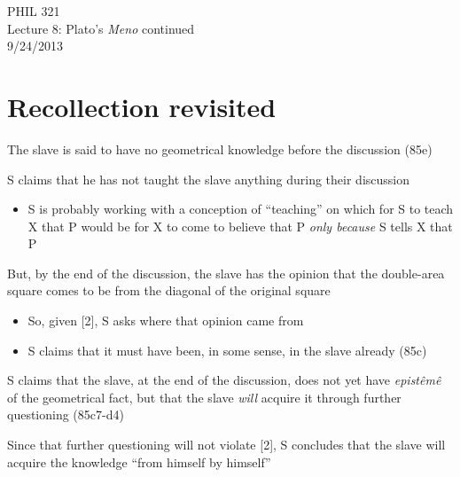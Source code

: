 \documentclass[11pt]{article}
\begin{document}
\thispagestyle{empty}
\begin{center} \LARGE{PHIL 321\\ Lecture 8: Plato's \emph{Meno} continued}\\ \vspace*{2mm}
\large{9/24/2013}\end{center}
\thispagestyle{empty}\vspace*{3mm}
\vspace*{-8mm}

\section*{Recollection revisited}

\noindent [1] The slave is said to have no geometrical knowledge before the discussion (85e)
\vspace*{2mm}

\noindent [2] S claims that he has not taught the slave anything during their discussion
\begin{itemize}\item{S is probably working with a conception of ``teaching'' on which for S to teach X that P would be for X to come to believe that P \emph{only because} S tells X that P}\end{itemize}

\noindent [3] But, by the end of the discussion, the slave has the opinion that the double-area square comes to be from the diagonal of the original square

\begin{itemize}\item{So, given [2], S asks where that opinion came from}\item{S claims that it must have been, in some sense, in the slave already (85c)}\end{itemize}

\noindent [4] S claims that the slave, at the end of the discussion, does not yet have \emph{epist\^{e}m\^{e}} of the geometrical fact, but that the slave \emph{will} acquire it through further questioning (85c7-d4)
\vspace*{2mm}

\noindent [5] Since that further questioning will not violate [2], S concludes that the slave will acquire the knowledge ``from himself by himself''
\vspace*{2mm}
\end{document}
